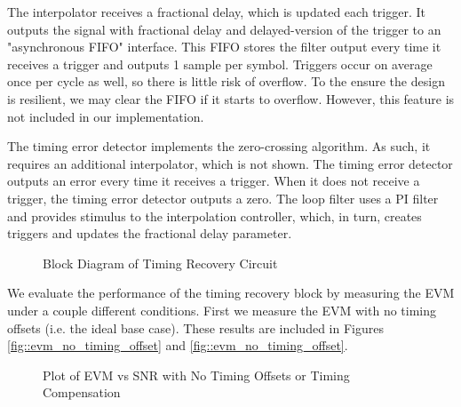 \documentclass{article}
\begin{document}
	The interpolator receives a fractional delay, which is updated each trigger. It outputs the signal with fractional delay and delayed-version of the trigger to an "asynchronous FIFO" interface. This FIFO stores the filter output every time it receives a trigger and outputs 1 sample per symbol. Triggers occur on average once per cycle as well, so there is little risk of overflow. To the ensure the design is resilient, we may clear the FIFO if it starts to overflow. However, this feature is not included in our implementation.
	
	The timing error detector implements the zero-crossing algorithm. As such, it requires an additional interpolator, which is not shown. The timing error detector outputs an error every time it receives a trigger. When it does not receive a trigger, the timing error detector outputs a zero. The loop filter uses a PI filter and provides stimulus to the interpolation controller, which, in turn, creates triggers and updates the fractional delay parameter.
	
\begin{figure}[H]
	\centerline{}
	\caption{Block Diagram of Timing Recovery Circuit}
	\label{fig::timing_recovery_block_diagram_2}
\end{figure}

We evaluate the performance of the timing recovery block by measuring the EVM under a couple different conditions. First we measure the EVM with no timing offsets (i.e. the ideal base case). These results are included in Figures \ref{fig::evm_no_timing_offset} and \ref{fig::evm_no_timing_offset}.

\begin{figure}[H]
	\centerline{}
	\caption{Plot of EVM vs SNR with No Timing Offsets or Timing Compensation}
	\label{fig::evm_no_timing_offset_no_comp}
\end{figure}
\end{document}
